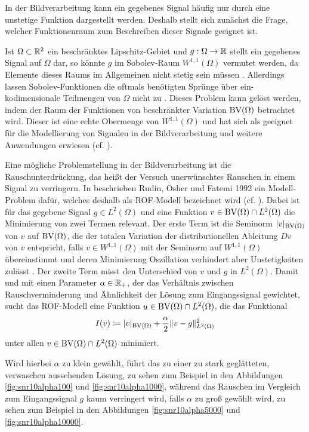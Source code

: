 In der Bildverarbeitung kann ein gegebenes Signal häufig nur durch eine
unstetige Funktion dargestellt werden. Deshalb stellt sich zunächst die Frage,
welcher Funktionenraum zum Beschreiben dieser Signale geeignet ist.

Ist $\Omega\subset\mathbb{R}^2$ ein beschränktes Lipschitz-Gebiet und $g:\Omega\to
\mathbb{R}$ stellt ein gegebenes Signal auf $\Omega$ dar, so könnte $g$ im
Sobolev-Raum $W^{1,1}(\Omega)$ vermutet werden, da Elemente dieses Raums im
Allgemeinen nicht stetig sein müssen \cite[297]{Bar15}. 
Allerdings lassen Sobolev-Funktionen die oftmals benötigten Sprünge über
ein-kodimensionale Teilmengen von $\Omega$ nicht zu \cite[393]{ABM14}.
Dieses Problem kann gelöst werden, indem der Raum der Funktionen von
beschränkter Variation $\textup{BV}(\Omega)$ betrachtet wird. Dieser ist eine echte
Obermenge von $W^{1,1}(\Omega)$ und hat sich als geeignet für die Modellierung 
von Signalen in der Bildverarbeitung und weitere Anwendungen erwiesen (cf.
\cites[393]{ABM14}[42]{AK06}[297]{Bar15}[S. 1 f.]{Bra98}).

Eine mögliche Problemstellung in der Bildverarbeitung ist die 
Rauschunterdrück\-ung, das heißt der Versuch unerwünschtes Rauschen in einem
Signal zu verringern.
In \cite{ROF92} beschrieben Rudin, Osher und Fatemi 1992 ein
Modell-Problem dafür, welches deshalb als ROF-Modell bezeichnet wird (cf.
\cites[1217]{Bar15a}[132]{CP10}[S. 74 f.]{Get12}).
Dabei ist für das gegebene Signal $g\in L^2(\Omega)$ und 
eine Funktion $v\in\textup{BV}(\Omega)\cap L^2(\Omega)$ die Minimierung
von zwei Termen relevant.
Der erste Term ist die
Seminorm $|v|_{\textup{BV}(\Omega)}$ von $v$ auf $\textup{BV}(\Omega)$, die der
totalen Variation der distributionellen Ableitung $Dv$ von $v$ entspricht,
falls $v\in W^{1,1}(\Omega)$ mit der Seminorm auf $W^{1,1}(\Omega)$
übereinstimmt und deren Minimierung Oszillation verhindert aber Unstetigkeiten
zulässt \cite[72]{Get12}. Der zweite Term misst den Unterschied von $v$ und $g$ in 
$L^2(\Omega)$.
Damit und mit einen Parameter
$\alpha\in\mathbb{R}_+$, der das Verhältnis zwischen Rauschverminderung und
Ähnlichkeit der Lösung zum Eingangssignal gewichtet, sucht das ROF-Modell
eine Funktion $u\in\textup{BV}(\Omega)\cap L^2(\Omega)$, die das Funktional
\begin{align*}
  I(v)\coloneqq |v|_{\textup{BV}(\Omega)}+\frac{\alpha}{2}\Vert
  v-g\Vert_{L^2(\Omega)}^2
\end{align*}
unter allen $v\in\textup{BV}(\Omega)\cap L^2(\Omega)$ minimiert.

Wird hierbei $\alpha$ zu klein gewählt, führt das zu einer zu stark
geglätteten, verwaschen aussehenden Lösung, zu sehen zum Beispiel in den
Abbildungen \ref{fig:snr10alpha100} und \ref{fig:snr10alpha1000}, während das
Rauschen im Vergleich zum Eingangssignal $g$ kaum verringert wird, falls
$\alpha$ zu groß gewählt wird, zu sehen zum Beispiel in den Abbildungen
\ref{fig:snr10alpha5000} und \ref{fig:snr10alpha10000}.

